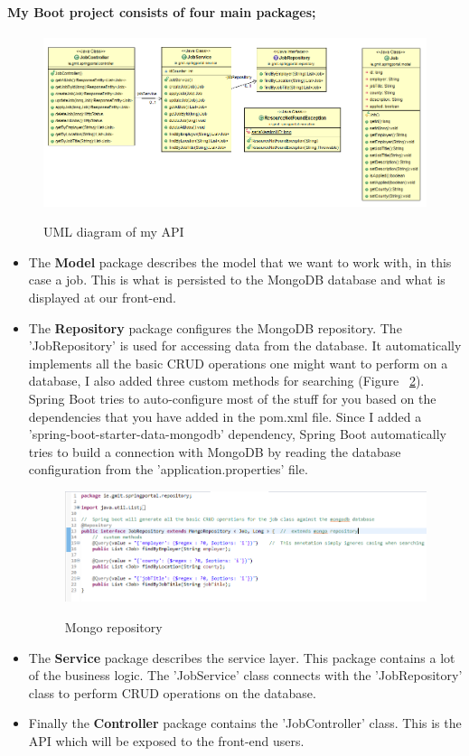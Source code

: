\paragraph{My Boot project consists of four main packages;}
\begin{figure}[ht]
    \centering
    \includegraphics[scale=0.4]{Images/API UML.png} 
    \label{api_label}
    \caption{UML diagram of my API}
\end{figure}
\begin{itemize}
    \item The \textbf{Model} package describes the model that we want to work with, in this case a job. This is what is persisted to the MongoDB database and what is displayed at our front-end.
    \item The \textbf{Repository} package configures the MongoDB repository. The 'JobRepository' is used for accessing data from the database. It automatically implements all the basic CRUD operations one might want to perform on a database, I also added three custom methods for searching (Figure ~\ref{repo_label}). Spring Boot tries to auto-configure most of the stuff for you based on the dependencies that you have added in the pom.xml file.
    Since I added a 'spring-boot-starter-data-mongodb' dependency, Spring Boot automatically tries to build a connection with MongoDB by reading the database configuration from the 'application.properties' file.
    \begin{figure}[h]
    \centering
    \includegraphics[scale=0.5]{Images/repo.png} 
    \label{repo_label}
    \caption{Mongo repository}
    \end{figure}
    \item The \textbf{Service} package describes the service layer. This package contains a lot of the business logic. The 'JobService' class connects with the 'JobRepository' class to perform CRUD operations on the database.
    \item Finally the \textbf{Controller} package contains the 'JobController' class. This is the API which will be exposed to the front-end users.
\end{itemize}


